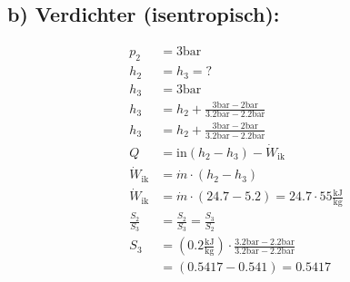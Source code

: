 \subsection*{b) Verdichter (isentropisch):}

\begin{align*}
    p_2 &= 3 \text{bar} \\
    h_2 &= h_3 = ? \\
    h_3 &= 3 \text{bar} \\
    h_3 &= h_2 + \frac{3 \text{bar} - 2 \text{bar}}{3.2 \text{bar} - 2.2 \text{bar}} \\
    h_3 &= h_2 + \frac{3 \text{bar} - 2 \text{bar}}{3.2 \text{bar} - 2.2 \text{bar}} \\
    Q &= \text{in} \left( h_2 - h_3 \right) - \dot{W}_{\text{ik}} \\
    \dot{W}_{\text{ik}} &= \dot{m} \cdot \left( h_2 - h_3 \right) \\
    \dot{W}_{\text{ik}} &= \dot{m} \cdot \left( 24.7 - 5.2 \right) = 24.7 \cdot 55 \frac{\text{kJ}}{\text{kg}} \\
    \frac{S_2}{S_3} &= \frac{S_2}{S_3} = \frac{S_3}{S_2} \\
    S_3 &= \left( 0.2 \frac{\text{kJ}}{\text{kg}} \right) \cdot \frac{3.2 \text{bar} - 2.2 \text{bar}}{3.2 \text{bar} - 2.2 \text{bar}} \\
    &= \left( 0.5417 - 0.541 \right) = 0.5417
\end{align*}